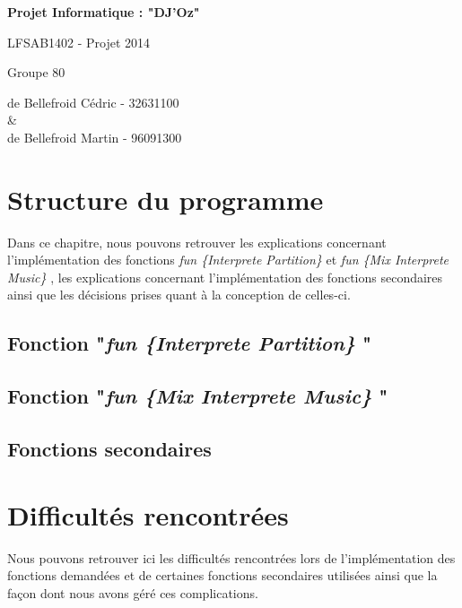 \documentclass[12pt, a4paper]{report}
\begin{document}
\vspace{5cm}

\begin{center}

\begin{LARGE}
\textbf{Projet Informatique : "DJ'Oz"}
\end{LARGE}
	
\vspace{1cm}

\begin{Large}
\begin{center}
LFSAB1402 - Projet 2014
\vspace{0.5cm}
\end{center}


Groupe 80 

\vspace{0.5cm}
de Bellefroid Cédric - 32631100 \\

\& \\
de Bellefroid Martin - 96091300
\end{Large}

\end{center}
\newpage

\chapter{Structure du programme}
	Dans ce chapitre, nous pouvons retrouver les explications concernant l'implémentation des fonctions \textit{fun \{Interprete Partition\} } et \textit{fun \{Mix Interprete Music\} }, les explications concernant l'implémentation des fonctions secondaires ainsi que les décisions prises quant à la conception de celles-ci.
	
\section{Fonction "\textit{fun \{Interprete Partition\} }"}


\section{Fonction "\textit{fun \{Mix Interprete Music\} }"}


\section{Fonctions secondaires}


\chapter{Difficultés rencontrées}
	Nous pouvons retrouver ici les difficultés rencontrées lors de l'implémentation des fonctions demandées et de certaines fonctions secondaires utilisées ainsi que la façon dont nous avons géré ces complications.
	
\end{document}
